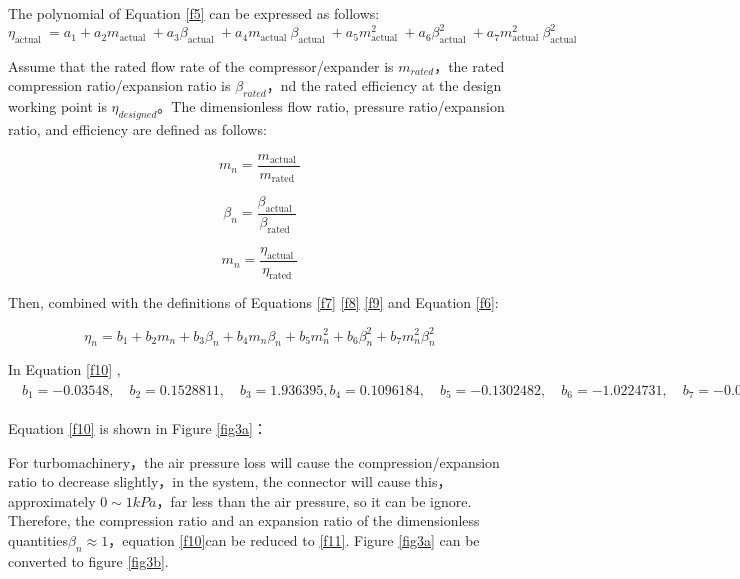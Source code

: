\documentclass[journal,onecolumn]{IEEEtran}
\begin{document}
The polynomial of Equation \ref{f5} can be expressed as follows:
\begin{equation}\label{f6}
	\eta_{\text {actual }}=a_{1}+a_{2} m_{\text {actual }}+a_{3} \beta_{\text {actual }}+a_{4} m_{\text {actual }} \beta_{\text {actual }}+a_{5} m_{\text {actual }}^{2}+a_{6} \beta_{\text {actual }}^{2}+a_{7} m_{\text {actual }}^{2} \beta_{\text {actual }}^{2}
\end{equation}


Assume that the rated flow rate of the compressor/expander is $ m_{rated}$，the rated compression ratio/expansion ratio is $ \beta_{rated}$，nd the rated efficiency at the design working point is $\eta_{designed}$。The dimensionless flow ratio, pressure ratio/expansion ratio, and efficiency are defined as follows:

\begin{equation}\label{f7}
	m_{n}=\frac{m_{\text {actual }}}{m_{\text {rated }}}
\end{equation}

\begin{equation}\label{f8}
	\beta_{n}=\frac{\beta_{\text {actual }}}{\beta_{\text {rated }}}
\end{equation}

\begin{equation}\label{f9}
	m_{n}=\frac{\eta_{\text {actual }}}{\eta_{\text {rated }}}
\end{equation}

Then, combined with the definitions of Equations \ref{f7} \ref{f8}  \ref{f9} and Equation \ref{f6}:

\begin{equation}\label{f10}
	\eta_{n}=b_{1}+b_{2} m_{n}+b_{3} \beta_{n}+b_{4} m_{n} \beta_{n}+b_{5} m_{n}^{2}+b_{6} \beta_{n}^{2}+b_{7} m_{n}^{2} \beta_{n}^{2}
\end{equation}

In Equation \ref{f10} ,$  \quad b_{1}=-0.03548, \quad b_{2}=0.1528811, \quad b_{3}=1.936395,b_{4}=0.1096184, \quad b_{5}=-0.1302482, \quad b_{6}=-1.0224731, \quad b_{7}=-0.0107012 $ \cite{b3}\ \\

Equation \ref{f10} is shown in Figure \ref{fig3a}：


For turbomachinery，the air pressure loss will cause the compression/expansion ratio to decrease slightly，in the system, the connector will cause this，approximately $ 0\sim 1 k P a $，far less than the air pressure, so it can be ignore. Therefore, the compression ratio and an expansion ratio of the dimensionless quantities$ \beta_{n} \approx 1 $，equation \ref{f10}can be reduced to \ref{f11}. Figure \ref{fig3a} can be converted to figure \ref{fig3b}.\\
\end{document}
